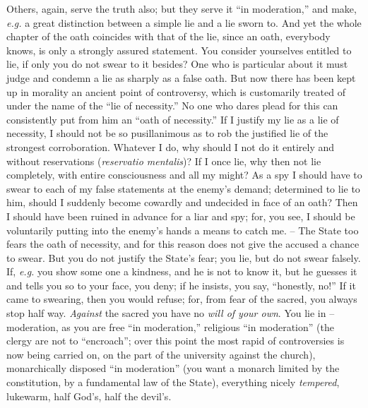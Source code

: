 Others, again, serve the truth also; but they serve it ``in moderation,'' 
and make, \textit{e.g.} a great distinction between a simple lie and a lie 
sworn to. And yet the whole chapter of the oath coincides with that of the 
lie, since an oath, everybody knows, is only a strongly assured statement. You 
consider yourselves entitled to lie, if only you do not swear to it besides? 
One who is particular about it must judge and condemn a lie as sharply as a 
false oath. But now there has been kept up in morality an ancient point of 
controversy, which is customarily treated of under the name of the ``lie of 
necessity.'' No one who dares plead for this can consistently put from him an 
``oath of necessity.'' If I justify my lie as a lie of necessity, I should 
not be so pusillanimous as to rob the justified lie of the strongest 
corroboration. Whatever I do, why should I not do it entirely and without 
reservations (\textit{reservatio mentalis})? If I once lie, why then not lie 
completely, with entire consciousness and all my might? As a spy I should have 
to swear to each of my false statements at the enemy's demand; determined to 
lie to him, should I suddenly become cowardly and undecided in face of an 
oath? Then I should have been ruined in advance for a liar and spy; for, you 
see, I should be voluntarily putting into the enemy's hands a means to catch 
me. -- The State too fears the oath of necessity, and for this reason does not 
give the accused a chance to swear. But you do not justify the State's fear; 
you lie, but do not swear falsely. If, \textit{e.g.} you show some one a 
kindness, and he is not to know it, but he guesses it and tells you so to your 
face, you deny; if he insists, you say, ``honestly, no!'' If it came to 
swearing, then you would refuse; for, from fear of the sacred, you always stop 
half way. \textit{Against} the sacred you have no \textit{will of your own}. 
You lie in -- moderation, as you are free ``in moderation,'' religious ``in 
moderation'' (the clergy are not to ``encroach''; over this point the most 
rapid of controversies is now being carried on, on the part of the university 
against the church), monarchically disposed ``in moderation'' (you want a 
monarch limited by the constitution, by a fundamental law of the State), 
everything nicely \textit{tempered}, lukewarm, half God's, half the devil's.

